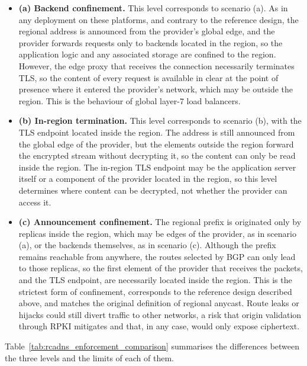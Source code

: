 \begin{itemize}
    \item \textbf{(a) Backend confinement.} This level corresponds to scenario (a). As in any deployment on these platforms, and contrary to the reference design, the regional address is announced from the provider's global edge, and the provider forwards requests only to backends located in the region, so the application logic and any associated storage are confined to the region. However, the edge proxy that receives the connection necessarily terminates TLS, so the content of every request is available in clear at the point of presence where it entered the provider's network, which may be outside the region. This is the behaviour of global layer-7 load balancers.

    \item \textbf{(b) In-region termination.} This level corresponds to scenario (b), with the TLS endpoint located inside the region. The address is still announced from the global edge of the provider, but the elements outside the region forward the encrypted stream without decrypting it, so the content can only be read inside the region. The in-region TLS endpoint may be the application server itself or a component of the provider located in the region, so this level determines where content can be decrypted, not whether the provider can access it.

    \item \textbf{(c) Announcement confinement.} The regional prefix is originated only by replicas inside the region, which may be edges of the provider, as in scenario (a), or the backends themselves, as in scenario (c). Although the prefix remains reachable from anywhere, the routes selected by BGP can only lead to those replicas, so the first element of the provider that receives the packets, and the TLS endpoint, are necessarily located inside the region. This is the strictest form of confinement, corresponds to the reference design described above, and matches the original definition of regional anycast. Route leaks or hijacks could still divert traffic to other networks, a risk that origin validation through RPKI mitigates and that, in any case, would only expose ciphertext.
\end{itemize}

Table~\ref{tab:rcadns_enforcement_comparison} summarises the differences between the three levels and the limits of each of them.

